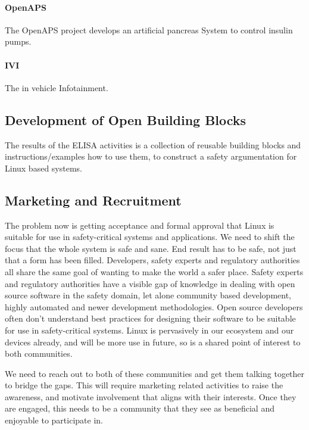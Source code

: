 \documentclass[12pt]{ElisaPaper}
\begin{document}
\paragraph{OpenAPS}

The OpenAPS project develops an artificial pancreas System to control insulin pumps.
%
\label{sssec:OpenAPS}

\paragraph{IVI}
\label{sssec:IVI}
The in vehicle Infotainment.

\subsection{Development of Open Building Blocks}
The results of the ELISA activities is a collection of reusable building blocks and instructions/examples how to use them, to construct a safety argumentation for Linux based systems.

\subsection{Marketing and Recruitment}
The problem now is getting acceptance and formal approval that Linux is suitable for use in safety-critical systems and applications.
We need to shift the focus that the whole system is safe and sane.
End result has to be safe,  not just that a form has been filled.
Developers, safety experts and regulatory authorities all share the same goal of wanting to make the world a safer place.
Safety experts and regulatory authorities have a visible gap of knowledge in dealing with open source software in the safety domain,  let alone community based development,  highly automated and newer development methodologies.
Open source developers often don’t understand best practices for designing their software to be suitable for use in safety-critical systems.
Linux is pervasively in our ecosystem and our devices already,  and will be more use in future, so is a shared point of interest to both communities.   


We need to reach out to both of these communities and get them talking together to bridge the gaps.
This will require marketing related activities to raise the awareness, and motivate involvement that aligns with their interests.
Once they are engaged, this needs to be a community that they see as beneficial and enjoyable to participate in. 
\end{document}
